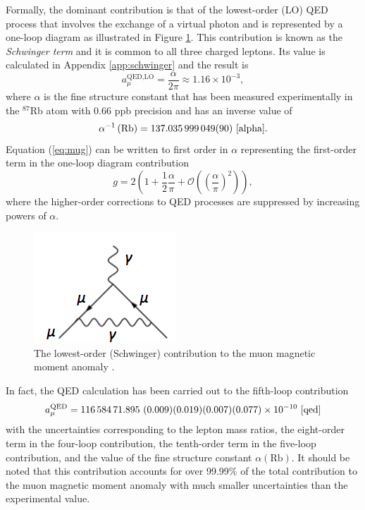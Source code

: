 \documentclass{outhesis}
\begin{document}
Formally, the dominant contribution is that of the lowest-order (LO) QED process that involves the exchange of a virtual photon and is represented by a one-loop diagram as illustrated in Figure \ref{fig:schwinger}. This contribution is known as the \emph{Schwinger term} and it is common to all three charged leptons. Its value is calculated in Appendix \ref{app:schwinger} and the result is 
\begin{equation}
a_{\mu}^{\text{QED,LO}} = \frac{\alpha}{2\pi} \approx 1.16 \times 10^{-3},
\label{eq:schwinger}
\end{equation}
where $\alpha$ is the fine structure constant that has been measured experimentally in the $^{87}$Rb atom with 0.66 ppb precision and has an inverse value of 
\begin{equation}
\alpha^{-1} \left(\text{Rb}\right)= 137.035\,999\,049(90) \,\,\cite{alpha}.
\end{equation}
Equation (\ref{eq:mug}) can be written to first order in $\alpha$ representing the first-order term in the one-loop diagram contribution
\begin{equation}
g = 2\left(1+\frac{1}{2}\frac{\alpha}{\pi}+ \mathcal{O}\left(\left(\frac{\alpha}{\pi}\right)^2\right)\right),
\label{eq:schwinger}
\end{equation}
where the higher-order corrections to QED processes are suppressed by increasing powers of $\alpha$.  
\begin{figure}
  \centering
  \includegraphics[scale=0.5]{figures/schwinger}
   \caption[Feynman diagram of the lowest-order contribution]{The lowest-order (Schwinger) contribution to the muon magnetic moment anomaly \cite{thesis}.}
\label{fig:schwinger}
\end{figure}
In fact, the QED calculation has been carried out to the fifth-loop contribution 
\begin{equation}
a_{\mu}^{\text{QED}} = 116\,584\,71.895 \,\, (0.009)(0.019)(0.007)(0.077) \times 10^{-10} \,\,\cite{qed}
\label{eq:qed}
\end{equation} 
with the uncertainties corresponding to the lepton mass ratios, the eight-order term in the four-loop contribution, the tenth-order term in the five-loop contribution, and the value of the fine structure constant $\alpha \left(\text{Rb}\right)$. It should be noted that this contribution accounts for over 99.99\% of the total contribution to the muon magnetic moment anomaly with much smaller uncertainties than the experimental value.
\end{document}
